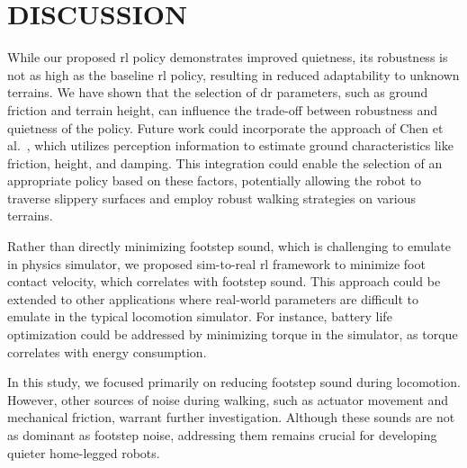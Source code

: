 \section{DISCUSSION}
While our proposed \ac{rl} policy demonstrates improved quietness, its robustness is not as high as the baseline \ac{rl} policy, resulting in reduced adaptability to unknown terrains. We have shown that the selection of \ac{dr} parameters, such as ground friction and terrain height, can influence the trade-off between robustness and quietness of the policy. Future work could incorporate the approach of Chen et al.~\cite{chen2024identifying}, which utilizes perception information to estimate ground characteristics like friction, height, and damping. This integration could enable the selection of an appropriate policy based on these factors, potentially allowing the robot to traverse slippery surfaces and employ robust walking strategies on various terrains.

Rather than directly minimizing footstep sound, which is challenging to emulate in physics simulator, we proposed sim-to-real \ac{rl} framework to minimize foot contact velocity, which correlates with footstep sound. This approach could be extended to other applications where real-world parameters are difficult to emulate in the typical locomotion simulator. For instance, battery life optimization could be addressed by minimizing torque in the simulator, as torque correlates with energy consumption. 

In this study, we focused primarily on reducing footstep sound during locomotion. However, other sources of noise during walking, such as actuator movement and mechanical friction, warrant further investigation. Although these sounds are not as dominant as footstep noise, addressing them remains crucial for developing quieter home-legged robots.
